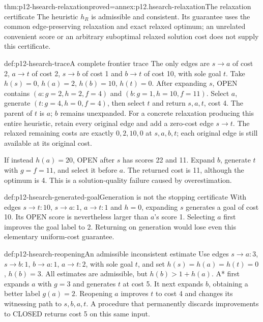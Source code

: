 \begin{hbtheorem}{thm:p12-hsearch-relaxation}{proved=annex:p12.hsearch-relaxation}{The relaxation certificate}
The heuristic \(h_R\) is admissible and consistent. Its guarantee uses
the common edge-preserving relaxation and exact relaxed optimum; an
unrelated convenient score or an arbitrary suboptimal relaxed solution
cost does not supply this certificate.
\end{hbtheorem}

\begin{hbexample}{def:p12-hsearch-trace}{A complete frontier trace}
The only edges are \(s\to a\) of cost 2, \(a\to t\) of cost 2,
\(s\to b\) of cost 1 and \(b\to t\) of cost 10, with sole goal
\(t\). Take \(h(s)=0\), \(h(a)=2\), \(h(b)=10\), \(h(t)=0\).
After expanding \(s\), OPEN contains
\((a:g=2,h=2,f=4)\) and \((b:g=1,h=10,f=11)\).
Select \(a\), generate \((t:g=4,h=0,f=4)\), then select \(t\)
and return \(s,a,t\), cost 4. The parent of \(t\) is \(a\);
\(b\) remains unexpanded. For a concrete relaxation producing this
entire heuristic, retain every original edge and add a zero-cost edge
\(s\to t\). The relaxed remaining costs are exactly
\(0,2,10,0\) at \(s,a,b,t\); each original edge is still available
at its original cost.

If instead \(h(a)=20\), OPEN after \(s\) has scores 22 and 11.
Expand \(b\), generate \(t\) with \(g=f=11\), and select it before
\(a\). The returned cost is 11, although the optimum is 4. This is a
solution-quality failure caused by overestimation.
\end{hbexample}

\begin{hbexample}{def:p12-hsearch-generated-goal}{Generation is not the stopping certificate}
With edges \(s\to t:10\), \(s\to a:1\), \(a\to t:1\)
and \(h=0\), expanding \(s\) generates a goal of cost 10.
Its OPEN score is nevertheless larger than \(a\)'s score 1.
Selecting \(a\) first improves the goal label to 2. Returning on
generation would lose even this elementary uniform-cost guarantee.
\end{hbexample}

\begin{hbexample}{def:p12-hsearch-reopening}{An admissible inconsistent estimate}
Use edges \(s\to a:3\), \(s\to b:1\), \(b\to a:1\),
\(a\to t:2\), with sole goal \(t\), and set
\(h(s)=h(a)=h(t)=0\), \(h(b)=3\).
All estimates are admissible, but \(h(b)>1+h(a)\).
A* first expands \(a\) with \(g=3\) and generates \(t\) at cost 5.
It next expands \(b\), obtaining a better label \(g(a)=2\).
Reopening \(a\) improves \(t\) to cost 4 and changes its witnessing
path to \(s,b,a,t\). A procedure that permanently discards improvements
to CLOSED returns cost 5 on this same input.
\end{hbexample}

